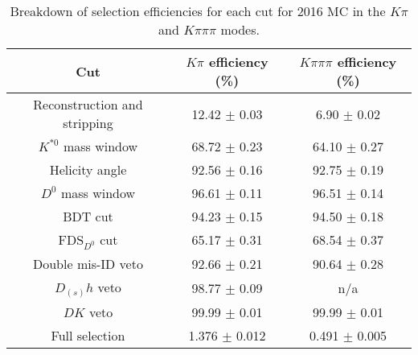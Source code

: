 \begin{table}
   \centering
   \begin{tabular}{ccc}
      \toprule
      Cut & $K\pi$ efficiency (\%) & $K\pi\pi\pi$ efficiency (\%)\\
      \midrule
      Reconstruction and stripping & 12.42 $\pm$ 0.03 & 6.90 $\pm$ 0.02 \\
      \midrule
      $K^{*0}$ mass window & 68.72 $\pm$ 0.23 & 64.10 $\pm$ 0.27 \\
      Helicity angle & 92.56 $\pm$ 0.16 & 92.75 $\pm$ 0.19 \\
      $D^0$ mass window & 96.61 $\pm$ 0.11 & 96.51 $\pm$ 0.14 \\
      BDT cut & 94.23 $\pm$ 0.15 & 94.50 $\pm$ 0.18 \\
      $\mathrm{FDS}_{D^0}$ cut & 65.17 $\pm$ 0.31 & 68.54 $\pm$ 0.37 \\
      Double mis-ID veto & 92.66 $\pm$ 0.21 & 90.64 $\pm$ 0.28 \\
      $D_{(s)}h$ veto & 98.77 $\pm$ 0.09& n/a \\
      $DK$ veto & 99.99 $\pm$ 0.01 & 99.99 $\pm$ 0.01 \\
      \midrule
      Full selection & 1.376 $\pm$ 0.012 & 0.491 $\pm$ 0.005 \\
      \bottomrule
  \end{tabular}
  \caption{Breakdown of selection efficiencies for each cut for 2016 MC in the $K\pi$ and $K\pi\pi\pi$ modes.}
\label{tab:sel_breakdown}
\end{table}
